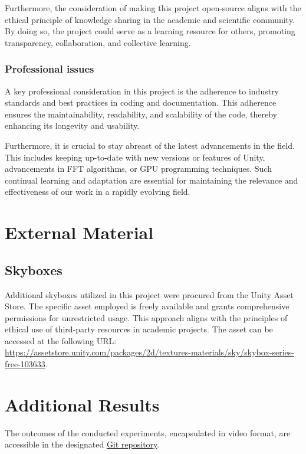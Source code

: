 \begin{appendices}
Furthermore, the consideration of making this project open-source aligns with the ethical principle of knowledge sharing in the academic and scientific community. By doing so, the project could serve as a learning resource for others, promoting transparency, collaboration, and collective learning.

\subsection{Professional issues}
A key professional consideration in this project is the adherence to industry standards and best practices in coding and documentation. This adherence ensures the maintainability, readability, and scalability of the code, thereby enhancing its longevity and usability.

Furthermore, it is crucial to stay abreast of the latest advancements in the field. This includes keeping up-to-date with new versions or features of Unity, advancements in FFT algorithms, or GPU programming techniques. Such continual learning and adaptation are essential for maintaining the relevance and effectiveness of our work in a rapidly evolving field.
%
%
\chapter{External Material}
\section{Skyboxes}
Additional skyboxes utilized in this project were procured from the Unity Asset Store. The specific asset employed is freely available and grants comprehensive permissions for unrestricted usage. This approach aligns with the principles of ethical use of third-party resources in academic projects. The asset can be accessed at the following URL: \url{https://assetstore.unity.com/packages/2d/textures-materials/sky/skybox-series-free-103633}.

%
%
\chapter{Additional Results}
The outcomes of the conducted experiments, encapsulated in video format, are accessible in the designated \href{https://github.com/uol-feps-soc-comp3931-2324-classroom/final-year-project-Biebras}{Git repository}.

\end{appendices}
